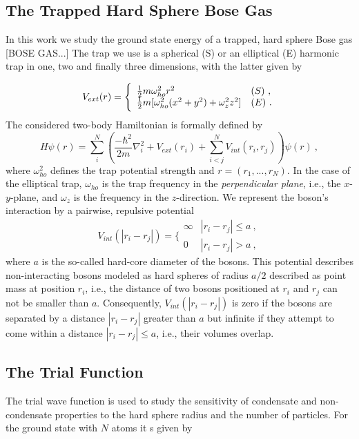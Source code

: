 \documentclass[11pt,a4paper]{article}
\numberwithin{equation}{section}
\begin{document}
\subsection{The Trapped Hard Sphere Bose Gas}
%
In this work we study the ground state energy of a trapped, hard sphere Bose gas
[BOSE GAS...]
%
The trap we use is a spherical (S) or an elliptical (E) harmonic trap in one, two and finally three dimensions, with the latter given by

\begin{equation}
V_{ext}(r) = 
\Bigg\{
\begin{array}{ll}
\frac{1}{2}m\omega_{ho}^2r^2 & (S)~,\\
\strut
\frac{1}{2}m[\omega_{ho}^2(x^2+y^2) + \omega_z^2z^2] & (E)~.
\label{trap_eqn}
\end{array}
\end{equation}
The considered two-body Hamiltonian is formally defined by
\begin{equation}
H\psi(r) = \sum_i^N \left(\frac{-\hbar^2}{2m}{\nabla }_{i}^2 +V_{ext}({{r}}_i)  +
\sum_{i<j}^{N} V_{int}({{r}}_i,{{r}}_j)\right)\psi(r)~,
\end{equation}
where $\omega_{ho}^2$ defines the trap potential strength and $r = (r_1,...,r_N)$.  
%
In the case of the elliptical trap, $\omega_{ho}$ is the trap frequency in the {\it perpendicular plane}, i.e., the $x$-$y$-plane, and $\omega_z$ is the frequency in the $z$-direction.  
%
We represent the boson's interaction by a pairwise, repulsive potential
\begin{equation}
V_{int}(|{r}_i-{r}_j|) =  \Bigg\{
\begin{array}{ll}
\infty & {|{r}_i-{r}_j|} \leq {a}~,\\
0 & {|{r}_i-{r}_j|} > {a}~,
\end{array}
\end{equation}
where $a$ is the so-called hard-core diameter of the bosons.
%
This potential describes non-interacting bosons modeled as hard spheres of radius $a/2$ described as point mass at position $r_i$, i.e., the distance of two bosons positioned at $r_i$ and $r_j$ can not be smaller than $a$.   
%
Consequently, $V_{int}(|{r}_i-{r}_j|)$ is zero if the bosons are separated by a distance $|{r}_i-{r}_j|$ greater than $a$ but infinite if they attempt to come within a distance $|{r}_i-{r}_j| \leq a$, i.e., their volumes overlap.

%
\subsection{The Trial Function}
%
%
The trial wave function is used to study the sensitivity of condensate and non-condensate properties to the hard sphere radius and the number of particles.
%
For the ground state with $N$ atoms it s given by
\end{document}
